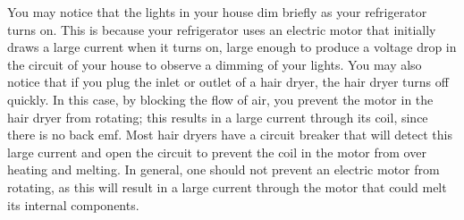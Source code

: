 You may notice that the lights in your house dim briefly as your refrigerator turns on. This is because your refrigerator uses an electric motor that initially draws a large current when it turns on, large enough to produce a voltage drop in the circuit of your house to observe a dimming of your lights. You may also notice that if you plug the inlet or outlet of a hair dryer, the hair dryer turns off quickly. In this case, by blocking the flow of air, you prevent the motor in the hair dryer from rotating; this results in a large current through its coil, since there is no back emf. Most hair dryers have a circuit breaker that will detect this large current and open the circuit to prevent the coil in the motor from over heating and melting. In general, one should not prevent an electric motor from rotating, as this will result in a large current through the motor that could melt its internal components. 

